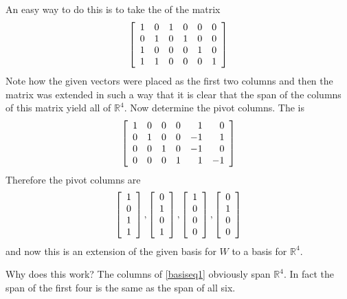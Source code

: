 \begin{solution}
An easy way to do this is to take the {\rref} of the matrix 
\begin{equation}
\left[
\begin{array}{cccccc}
1 & 0 & 1 & 0 & 0 & 0 \\ 
0 & 1 & 0 & 1 & 0 & 0 \\ 
1 & 0 & 0 & 0 & 1 & 0 \\ 
1 & 1 & 0 & 0 & 0 & 1
\end{array}
\right]  \label{basiseq1}
\end{equation}
Note how the given vectors were placed as the first two columns and then the matrix
was extended in such a way that it is clear that the span of the columns of
this matrix yield all of $\mathbb{R}^{4}$. Now determine the pivot columns.
The {\rref} is 
\begin{equation}
\left[
\begin{array}{rrrrrr}
1 & 0 & 0 & 0 & 1 & 0 \\ 
0 & 1 & 0 & 0 & -1 & 1 \\ 
0 & 0 & 1 & 0 & -1 & 0 \\ 
0 & 0 & 0 & 1 & 1 & -1
\end{array}
\right]  \label{basiseq2}
\end{equation}
Therefore the pivot columns are 
\begin{equation*}
\left[
\begin{array}{c}
1 \\ 
0 \\ 
1 \\ 
1
\end{array}
\right] ,\left[ 
\begin{array}{c}
0 \\ 
1 \\ 
0 \\ 
1
\end{array}
\right] ,\left[ 
\begin{array}{c}
1 \\ 
0 \\ 
0 \\ 
0
\end{array}
\right] ,\left[ 
\begin{array}{c}
0 \\ 
1 \\ 
0 \\ 
0
\end{array}
\right]
\end{equation*}
and now this is an extension of the given basis for $W$ to a basis for $
\mathbb{R}^{4}$.

Why does this work? The columns of \ref{basiseq1} obviously span $\mathbb{R
}^{4}$. In fact the span of the first four is the same as the span of all
six. 
\end{solution}

